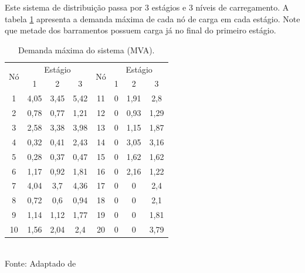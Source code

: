 Este sistema de distribuição passa por 3 estágios e 3 níveis de carregamento. A tabela \ref{tab:param_carga} apresenta a demanda máxima de cada nó de carga em cada estágio. Note que metade dos barramentos possuem carga já no final do primeiro estágio.
\begin{table}[ht]
\centering
\caption{Demanda máxima do sistema (MVA).}
\label{tab:param_carga}
\begin{tabular}{@{}cccccccc@{}}
\toprule
\multirow{2}{*}{Nó} & \multicolumn{3}{c}{Estágio} & \multirow{2}{*}{Nó} & \multicolumn{3}{c}{Estágio} \\ \cmidrule(lr){2-4} \cmidrule(l){6-8} 
   & 1    & 2    & 3    &    & 1 & 2    & 3    \\ \midrule
1  & 4,05 & 3,45 & 5,42 & 11 & 0 & 1,91 & 2,8  \\
2  & 0,78 & 0,77 & 1,21 & 12 & 0 & 0,93 & 1,29 \\
3  & 2,58 & 3,38 & 3,98 & 13 & 0 & 1,15 & 1,87 \\
4  & 0,32 & 0,41 & 2,43 & 14 & 0 & 3,05 & 3,16 \\
5  & 0,28 & 0,37 & 0,47 & 15 & 0 & 1,62 & 1,62 \\
6  & 1,17 & 0,92 & 1,81 & 16 & 0 & 2,16 & 1,22 \\
7  & 4,04 & 3,7  & 4,36 & 17 & 0 & 0    & 2,4  \\
8  & 0,72 & 0,6  & 0,94 & 18 & 0 & 0    & 2,1  \\
9  & 1,14 & 1,12 & 1,77 & 19 & 0 & 0    & 1,81 \\
10 & 1,56 & 2,04 & 2,4  & 20 & 0 & 0    & 3,79 \\ \bottomrule
\end{tabular}
\\Fonte: Adaptado de 
\end{table}

